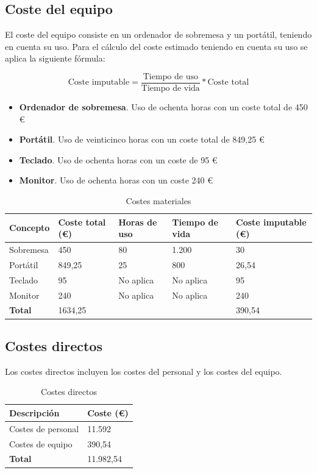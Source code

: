 \documentclass[12pt]{report} %
\begin{document}
	\subsection{Coste del equipo}
	El coste del equipo consiste en un ordenador de sobremesa y un portátil, teniendo en cuenta su uso.
	Para el cálculo del coste estimado teniendo en cuenta su uso se aplica la siguiente fórmula:

	\begin{equation}
		\text{Coste imputable} = \frac{\text{Tiempo de uso}}{\text{Tiempo de vida}} * \text{Coste total}
	\end{equation}

	\begin{itemize}
		\item \textbf{Ordenador de sobremesa}. Uso de ochenta horas con un coste total de 450 €
		\item \textbf{Portátil}. Uso de veinticinco horas con un coste total de 849,25 €
		\item \textbf{Teclado}. Uso de ochenta horas con un coste de 95 €
		\item \textbf{Monitor}. Uso de ochenta horas con un coste 240 €
	\end{itemize}

	\begin{table}[H]
		\centering
		\caption{Costes materiales}
		\begin{tabular}{lllll}
				\toprule
				\textbf{Concepto} & \textbf{Coste total (€)} & \textbf{Horas de uso} & \textbf{Tiempo de vida} & \textbf{Coste imputable (€)}\\
				\midrule
				Sobremesa & 450 & 80 & 1.200  & 30 \\
				Portátil & 849,25 & 25 & 800  & 26,54 \\
				Teclado & 95 & No aplica & No aplica  & 95 \\
				Monitor & 240 & No aplica & No aplica  & 240 \\
				\bottomrule
				\textbf{Total} & 1634,25 & & & 390,54
		\end{tabular}
	\end{table}

	\subsection{Costes directos}
	Los costes directos incluyen los costes del personal y los costes del equipo.
	\begin{table}[H]
		\centering
		\caption{Costes directos}
		\begin{tabular}{ll}
				\toprule
				\textbf{Descripción} & \textbf{Coste (€)}\\
				\midrule
				Costes de personal & 11.592  \\
				Costes de equipo & 390,54  \\
				\bottomrule
				\textbf{Total} & 11.982,54
		\end{tabular}
	\end{table}
\end{document}
